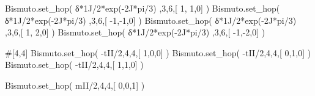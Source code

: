\documentclass[
  letterpaper,
  DIV=11,
  numbers=noendperiod]{scrreprt}
\newenvironment{Shaded}{\begin{snugshade}}{\end{snugshade}}
\newcommand{\CommentTok}[1]{\textcolor[rgb]{0.37,0.37,0.37}{#1}}
\newcommand{\DecValTok}[1]{\textcolor[rgb]{0.68,0.00,0.00}{#1}}
\newcommand{\NormalTok}[1]{\textcolor[rgb]{0.00,0.23,0.31}{#1}}
\newcommand{\OperatorTok}[1]{\textcolor[rgb]{0.37,0.37,0.37}{#1}}
\newcommand{\OtherTok}[1]{\textcolor[rgb]{0.00,0.23,0.31}{#1}}
\begin{document}
\begin{Shaded}
\begin{Highlighting}[]
\NormalTok{Bismuto.set\_hop(   δ}\OperatorTok{*}\OtherTok{1J}\OperatorTok{/}\DecValTok{2}\OperatorTok{*}\NormalTok{exp(}\OperatorTok{{-}}\OtherTok{2J}\OperatorTok{*}\NormalTok{pi}\OperatorTok{/}\DecValTok{3}\NormalTok{) ,}\DecValTok{3}\NormalTok{,}\DecValTok{6}\NormalTok{,[  }\DecValTok{1}\NormalTok{, }\DecValTok{1}\NormalTok{,}\DecValTok{0}\NormalTok{] )}
\NormalTok{Bismuto.set\_hop(   δ}\OperatorTok{*}\OtherTok{1J}\OperatorTok{/}\DecValTok{2}\OperatorTok{*}\NormalTok{exp(}\OperatorTok{{-}}\OtherTok{2J}\OperatorTok{*}\NormalTok{pi}\OperatorTok{/}\DecValTok{3}\NormalTok{) ,}\DecValTok{3}\NormalTok{,}\DecValTok{6}\NormalTok{,[ }\OperatorTok{{-}}\DecValTok{1}\NormalTok{,}\OperatorTok{{-}}\DecValTok{1}\NormalTok{,}\DecValTok{0}\NormalTok{] )}
\NormalTok{Bismuto.set\_hop(   δ}\OperatorTok{*}\OtherTok{1J}\OperatorTok{/}\DecValTok{2}\OperatorTok{*}\NormalTok{exp(}\OperatorTok{{-}}\OtherTok{2J}\OperatorTok{*}\NormalTok{pi}\OperatorTok{/}\DecValTok{3}\NormalTok{) ,}\DecValTok{3}\NormalTok{,}\DecValTok{6}\NormalTok{,[  }\DecValTok{1}\NormalTok{, }\DecValTok{2}\NormalTok{,}\DecValTok{0}\NormalTok{] )}
\NormalTok{Bismuto.set\_hop(   δ}\OperatorTok{*}\OtherTok{1J}\OperatorTok{/}\DecValTok{2}\OperatorTok{*}\NormalTok{exp(}\OperatorTok{{-}}\OtherTok{2J}\OperatorTok{*}\NormalTok{pi}\OperatorTok{/}\DecValTok{3}\NormalTok{) ,}\DecValTok{3}\NormalTok{,}\DecValTok{6}\NormalTok{,[ }\OperatorTok{{-}}\DecValTok{1}\NormalTok{,}\OperatorTok{{-}}\DecValTok{2}\NormalTok{,}\DecValTok{0}\NormalTok{] )}
\end{Highlighting}
\end{Shaded}

\begin{Shaded}
\begin{Highlighting}[]
\CommentTok{\#[4,4]}
\NormalTok{Bismuto.set\_hop( }\OperatorTok{{-}}\NormalTok{tII}\OperatorTok{/}\DecValTok{2}\NormalTok{,}\DecValTok{4}\NormalTok{,}\DecValTok{4}\NormalTok{,[ }\DecValTok{1}\NormalTok{,}\DecValTok{0}\NormalTok{,}\DecValTok{0}\NormalTok{] ) }
\NormalTok{Bismuto.set\_hop( }\OperatorTok{{-}}\NormalTok{tII}\OperatorTok{/}\DecValTok{2}\NormalTok{,}\DecValTok{4}\NormalTok{,}\DecValTok{4}\NormalTok{,[ }\DecValTok{0}\NormalTok{,}\DecValTok{1}\NormalTok{,}\DecValTok{0}\NormalTok{] ) }
\NormalTok{Bismuto.set\_hop( }\OperatorTok{{-}}\NormalTok{tII}\OperatorTok{/}\DecValTok{2}\NormalTok{,}\DecValTok{4}\NormalTok{,}\DecValTok{4}\NormalTok{,[ }\DecValTok{1}\NormalTok{,}\DecValTok{1}\NormalTok{,}\DecValTok{0}\NormalTok{] ) }
 
\NormalTok{Bismuto.set\_hop(  mII}\OperatorTok{/}\DecValTok{2}\NormalTok{,}\DecValTok{4}\NormalTok{,}\DecValTok{4}\NormalTok{,[ }\DecValTok{0}\NormalTok{,}\DecValTok{0}\NormalTok{,}\DecValTok{1}\NormalTok{] ) }
\end{Highlighting}
\end{Shaded}
\end{document}
